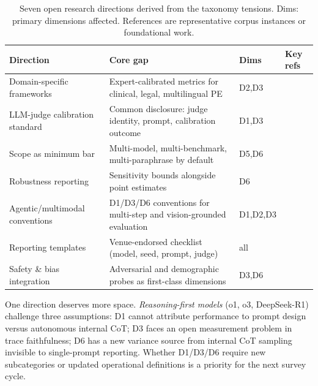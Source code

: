 \documentclass[acmsmall, nonacm, screen]{acmart}
\begin{document}
\begin{table}[!htbp]
\renewcommand{\arraystretch}{1.15}
\caption{Seven open research directions derived from the taxonomy
tensions. Dims: primary dimensions affected. References are
representative corpus instances or foundational work.}
\label{tab:agenda}
\centering
\footnotesize
\setlength{\tabcolsep}{5pt}
\begin{tabular}{p{3.0cm} p{4.0cm} p{1.0cm} p{4.0cm}}
\toprule
\textbf{Direction} & \textbf{Core gap} & \textbf{Dims} & \textbf{Key refs} \\
\midrule
Domain-specific frameworks & Expert-calibrated metrics for clinical, legal, multilingual PE & D2,D3 & \cite{sivarajkumar2024empirical,guha2023legalbench,wildbench2024} \\
\midrule
LLM-judge calibration standard & Common disclosure: judge identity, prompt, calibration outcome & D1,D3 & \cite{alternativeannotator2025,verga2024replacing,chern2024scaleeval} \\
\midrule
Scope as minimum bar & Multi-model, multi-benchmark, multi-paraphrase by default & D5,D6 & \cite{mizrahi2024state,sclar2023formatting,promptsensitivity2025} \\
\midrule
Robustness reporting & Sensitivity bounds alongside point estimates & D6 & \cite{bellibatlu2026judgesense,polo2024promptseval} \\
\midrule
Agentic/multimodal conventions & D1/D3/D6 conventions for multi-step and vision-grounded evaluation & D1,D2,D3 & \cite{fu2023mme,yao2024taubench} \\
\midrule
Reporting templates & Venue-endorsed checklist (model, seed, prompt, judge) & all & \cite{repairing2022,raji2021ai} \\
\midrule
Safety \& bias integration & Adversarial and demographic probes as first-class dimensions & D3,D6 & \cite{gallegos2023bias,wei2023jailbroken} \\
\bottomrule
\end{tabular}
\end{table}

One direction deserves more space. \emph{Reasoning-first models}
(o1, o3, DeepSeek-R1) challenge three assumptions: D1 cannot
attribute performance to prompt design versus autonomous internal
CoT; D3 faces an open measurement problem in trace faithfulness;
D6 has a new variance source from internal CoT sampling invisible
to single-prompt reporting. Whether D1/D3/D6 require new
subcategories or updated operational definitions is a priority for
the next survey cycle.
\end{document}
